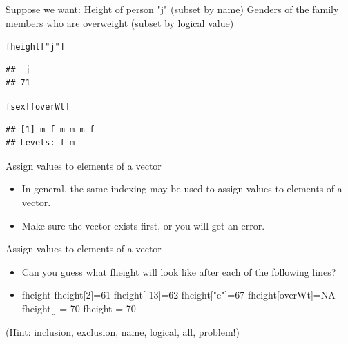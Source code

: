 \documentclass{beamer}\usepackage[]{graphicx}\usepackage[]{color}
\makeatletter
\newcommand{\hlstr}[1]{\textcolor[rgb]{0.192,0.494,0.8}{#1}}%
\newcommand{\hlstd}[1]{\textcolor[rgb]{0.345,0.345,0.345}{#1}}%
\newenvironment{kframe}{%
 \def\at@end@of@kframe{}%
 \ifinner\ifhmode%
  \def\at@end@of@kframe{\end{minipage}}%
  \begin{minipage}{\columnwidth}%
 \fi\fi%
 \def\FrameCommand##1{\hskip\@totalleftmargin \hskip-\fboxsep
 \colorbox{shadecolor}{##1}\hskip-\fboxsep
     \hskip-\linewidth \hskip-\@totalleftmargin \hskip\columnwidth}%
 \MakeFramed {\advance\hsize-\width
   \@totalleftmargin\z@ \linewidth\hsize
   \@setminipage}}%
 {\par\unskip\endMakeFramed%
 \at@end@of@kframe}
\newenvironment{knitrout}{}{} %
\renewenvironment{knitrout}{\begin{singlespace}}{\end{singlespace}}
\theoremstyle{mystyle}
\makeatother
\begin{document}
\begin{frame}[fragile]{Suppose we want:}
Height of person "j" (subset by name)
Genders of the family members who are overweight (subset by logical value)
\begin{knitrout}
\color{fgcolor}\begin{kframe}
\begin{alltt}
\hlstd{fheight[}\hlstr{"j"}\hlstd{]}
\end{alltt}
\begin{verbatim}
##  j 
## 71
\end{verbatim}
\begin{alltt}
\hlstd{fsex[foverWt]}
\end{alltt}
\begin{verbatim}
## [1] m f m m m f
## Levels: f m
\end{verbatim}
\end{kframe}
\end{knitrout}
\end{frame}

\begin{frame}[fragile]{Assign values to elements of a vector}
\begin{itemize}
\item In general, the same indexing may be used to assign values to elements of a vector.  
\item Make sure the vector exists first, or you will get an error.
\end{itemize}
\end{frame}

\begin{frame}[fragile]{Assign values to elements of a vector}
\begin{itemize}
\item Can you guess what fheight will look like after each of the following lines?
\item fheight 
 fheight[2]=61
 fheight[-13]=62
 fheight["e"]=67
 fheight[overWt]=NA
 fheight[] = 70
 fheight = 70
\end{itemize}
(Hint: inclusion, exclusion, name, logical, all, problem!)

\end{frame}
\end{document}
